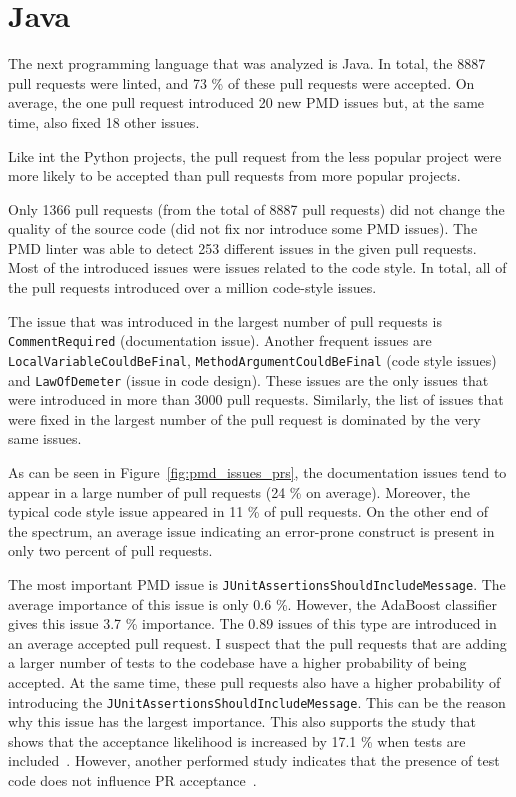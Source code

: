 \documentclass[digital,oneside,oldtable,nolof,nolot,nocover]{fithesis4}
\begin{document}
\section{Java}
\label{sec:org80124d6}
The next programming language that was analyzed is Java. In total, the 8887
pull requests were linted, and 73 \% of these pull requests were accepted.
On average, the one pull request introduced 20 new PMD issues but,
at the same time, also fixed 18 other issues.

Like int the Python projects, the pull request from the less popular project
were more likely to be accepted than pull requests from more popular projects.

Only 1366 pull requests (from the total of 8887 pull requests) did not change
the quality of the source code (did not fix nor introduce some PMD issues).
The PMD linter was able to detect 253 different issues in the given pull requests.
Most of the introduced issues were issues related to the code style. In total,
all of the pull requests introduced over a million code-style issues.

The issue that was introduced in the largest number of pull requests is
\texttt{CommentRequired} (documentation issue).  Another frequent issues are
\texttt{LocalVariableCouldBeFinal}, \texttt{MethodArgumentCouldBeFinal} (code style issues)
and \texttt{LawOfDemeter} (issue in code design). These issues are the only issues
that were introduced in more than 3000 pull requests. Similarly, the list of issues
that were fixed in the largest number of the pull request is dominated by the
very same issues.

As can be seen in Figure~\ref{fig:pmd_issues_prs}, the documentation issues
tend to appear in a large number of pull requests (24 \% on average). Moreover,
the typical code style issue appeared in 11 \% of pull requests. On the other
end of the spectrum, an average issue indicating an error-prone construct is present in only two
percent of pull requests.

The most important PMD issue is \texttt{JUnitAssertionsShouldIncludeMessage}. The
average importance of this issue is only 0.6 \%. However, the AdaBoost
classifier gives this issue 3.7 \% importance.  The 0.89 issues of this type
are introduced in an average accepted pull request. I suspect that the pull
requests that are adding a larger number of tests to the codebase have a higher
probability of being accepted. At the same time, these pull requests also have a higher probability
of introducing the \texttt{JUnitAssertionsShouldIncludeMessage}. This can be the
reason why this issue has the largest importance.  This also supports the
study that shows that the acceptance likelihood is increased by 17.1 \% when
tests are included~\cite{social}. However, another performed study indicates that
the presence of test code does not influence PR acceptance~\cite{exploratory}.
\end{document}
